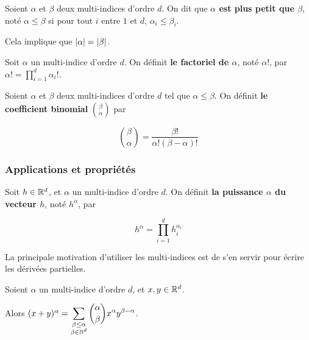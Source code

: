 \begin{definition} 
	Soient $\alpha$ et $\beta$ deux multi-indices d'ordre $d$.
	On dit que \textbf{$\alpha$ est plus petit que $\beta$}, noté $\alpha \leq \beta$ si
	pour tout $i$ entre $1$ et $d$, $\alpha_{i} \leq \beta_{i}$.

	Cela implique que $|\alpha| = |\beta|$.
\end{definition}

\begin{definition}
	Soit $\alpha$ un multi-indice d'ordre $d$.
	On définit \textbf{le factoriel de $\alpha$}, noté $\alpha!$, par $\alpha! =
	\displaystyle \prod_{i = 1}^{d} \alpha_{i} !$.
\end{definition}

\begin{definition}
	Soient $\alpha$ et $\beta$ deux multi-indices d'ordre $d$ tel que $\alpha
	\leq \beta$.
	On définit \textbf{le coefficient binomial} $\displaystyle \binom{\beta}{\alpha}$ par

	\begin{equation*}
		\displaystyle \binom{\beta}{\alpha} = \frac{\beta!}{\alpha! (\beta -
		\alpha)!}
	\end{equation*}
\end{definition}

\subsubsection{Applications et propriétés}

\begin{definition}
	Soit $h \in \mathbb{R}^{d}$, et $\alpha$ un multi-indice d'ordre $d$.
	On définit \textbf{la puissance $\alpha$ du vecteur $h$}, noté $h^{\alpha}$,
	par

	\begin{equation*}
		h^{\alpha} = \displaystyle \prod_{i = 1}^{d} h_{i}^{\alpha_{i}}
	\end{equation*}
\end{definition}

La principale motivation d'utiliser les multi-indices est de s'en servir pour
écrire les dérivées partielles.


\begin{proposition} 
	Soient $\alpha$ un multi-indice d'ordre $d$, et $x, y \in \mathbb{R}^{d}$.

	Alors $(x + y)^{\alpha} = \displaystyle \sum_{\substack{\beta \leq \alpha \\ \beta \in
		\mathbb{N}^{d}}} \binom{\alpha}{\beta} x^{\alpha} y^{\beta - \alpha}$.
\end{proposition}

